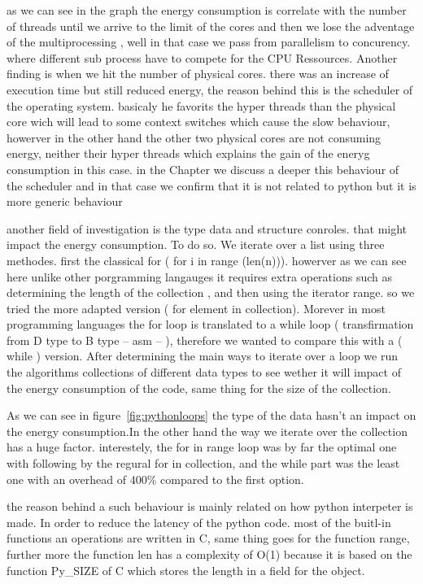 as we can see in the graph the energy consumption is correlate with the number of threads until we arrive to the limit of the cores and then we lose the adventage of the multiprocessing , well in that case we pass from parallelism to concurency. where different sub process have to compete for the CPU Ressources.
Another finding is when we hit the number of physical cores. there was an increase of execution time but still reduced energy, the reason behind this is the scheduler of the operating system. basicaly he favorits the hyper threads than the physical core wich will lead to some context switches which cause the slow behaviour, howerver in the other hand the other two physical cores are not consuming energy, neither their hyper threads which explains the gain of the eneryg consumption in this case.
in the Chapter %
we discuss a deeper this behaviour of the scheduler and in that case we confirm that it is not related to python but it is more generic behaviour %

another field of investigation is the type data and structure conroles. that might impact the energy consumption.
To do so. We iterate over a list using three methodes.
first the classical for ( for i in range (len(n))). howerver as we can see here unlike other porgramming langauges it requires extra operations such as determining the length of the collection , and then using the iterator range. so we tried the more adapted version
( for element in collection). Morever in most programming languages the for loop is translated to a while loop ( transfirmation from D type to B type -- asm -- ), therefore we wanted to compare this with a ( while ) version.
After determining the main ways to iterate over a loop we run the algorithms  collections of different data types to see wether it will impact of the energy consumption of the code, same thing for the size of the collection.

As we can see in figure~\ref{fig:pythonloops} the type of the data hasn't an impact on the energy consumption.In the other hand the way we iterate over the collection has a huge factor. interestely, the for in range loop was by far the optimal one with following by the regural for in collection, and the while part was the least one with an overhead of 400\% compared to the first option.



the reason behind a such behaviour is mainly related on how python interpeter is made.
In order to reduce the latency of the python code. most of the buitl-in functions an operations are written in C, same thing goes for the function range, further more the function len has a complexity of O(1) because it is based on the function Py\_SIZE  of C which stores the length in a field for the object.

